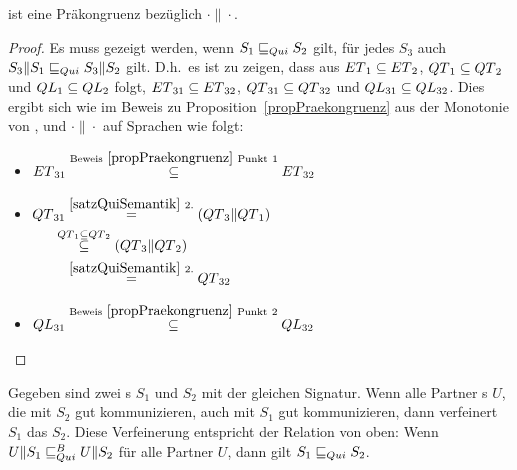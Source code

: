 \begin{prop}[Präkongruenz]
  \label{propQuiPrae}
  \QRel{} ist eine Präkongruenz bezüglich $\cdot\|\cdot$.
\end{prop}

\begin{proof}
  Es muss gezeigt werden, wenn $S_1\sqsubseteq _{Qui} S_2$ gilt,  für   jedes $
  S_3$ auch $S_3\|S_1\sqsubseteq _{Qui} S_3\|S_2$ gilt. D.h.\ es ist zu zeigen,
  dass aus $ET{}_1\subseteq ET{}_2$, $QT{}_1\subseteq QT{}_2$ und
  $QL{}_1\subseteq QL{}_2$ folgt, $ET{}_{31}\subseteq ET{}_{32}$,
  $QT{}_{31}\subseteq QT{}_{32}$ und $QL{}_{31}\subseteq QL{}_{32}$. Dies
  ergibt sich wie im Beweis zu Proposition~\ref{propPraekongruenz} aus der
  Monotonie von \cont{}, \prune{} und $\cdot\|\cdot$ auf Sprachen wie folgt:
  \begin{itemize}
    \item $\begin{aligned}[t]
        ET{}_{31} \overset{\mathrm{Beweis}~\ref{propPraekongruenz}
        ~\mathrm{Punkt}~1}{\subseteq} ET{}_{32}
    \end{aligned}$
    \item $\begin{aligned}[t]
        \QT{}_{31} &\overset{\ref{satzQuiSemantik}~2.}{=} (\QT{}_3\|\QT{}_1)\\
                &\hspace{-0.3cm}\overset{\QT{}_1\subseteq \QT{}_2}{\subseteq} (\QT{}_3\|\QT{}_2)\\
                &\overset{\ref{satzQuiSemantik}~2.}{=} \QT{}_{32}
    \end{aligned}$
    \item $\begin{aligned}[t]
        QL{}_{31} \overset{\mathrm{Beweis}~\ref{propPraekongruenz}
        ~\mathrm{Punkt}~2}{\subseteq} QL{}_{32}
    \end{aligned}$
  \end{itemize}
\end{proof}

\begin{lem}
  \label{lemQuiVerfeinerung}
  Gegeben sind zwei \EIO{}s $S_1$ und $S_2$ mit der gleichen Signatur. Wenn
  alle Partner \EIO{}s $U$, die mit $S_2$  gut kommunizieren, auch mit $S_1$
  gut kommunizieren, dann verfeinert $S_1$ das \EIO{} $S_2$. Diese Verfeinerung
  entspricht der Relation \QRel{} von oben: Wenn $U\|S_1\sqsubseteq _{Qui}^B U\|S_2$ für alle
  Partner $U$, dann gilt $S_1\sqsubseteq _{Qui} S_2$.
\end{lem}

